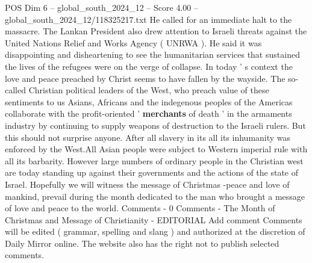 \begin{textsample}{POS Dim 6 – global\_south\_2024\_12 – Score 4.00 – global\_south\_2024\_12/118325217.txt}
He called for an immediate halt to the massacre.
The Lankan President also drew attention to Israeli threats against the United Nations Relief and Works Agency ( UNRWA ).
He said it was disappointing and disheartening to see the humanitarian services that sustained the lives of the refugees were on the verge of collapse.
In today ' s context the love and peace preached by Christ seems to have fallen by the wayside.
The so-called Christian political leaders of the West, who preach value of these sentiments to us Asians, Africans and the indegenous peoples of the Americas collaborate with the profit-oriented ' \textbf{merchants} of death ' in the armaments industry by continuing to supply weapons of destruction to the Israeli rulers.
But this should not surprise anyone.
After all slavery in its all its inhumanity was enforced by the West.All Asian people were subject to Western imperial rule with all its barbarity.
However large numbers of ordinary people in the Christian west are today standing up against their governments and the actions of the state of Israel.
Hopefully we will witness the message of Christmas -peace and love of mankind, prevail during the month dedicated to the man who brought a message of love and peace to the world.
Comments - 0 Comments - The Month of Christmas and Message of Christianity - EDITORIAL Add comment Comments will be edited ( grammar, spelling and slang ) and authorized at the discretion of Daily Mirror online.
The website also has the right not to publish selected comments.

\end{textsample}
